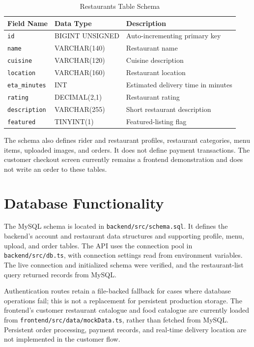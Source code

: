 \begin{table}[H]
\centering
\caption{Restaurants Table Schema}
\label{tab:restaurants}
\begin{tabular}{|l|l|p{7cm}|}
\hline
\textbf{Field Name} & \textbf{Data Type} & \textbf{Description} \\ \hline
\texttt{id} & BIGINT UNSIGNED & Auto-incrementing primary key \\ \hline
\texttt{name} & VARCHAR(140) & Restaurant name \\ \hline
\texttt{cuisine} & VARCHAR(120) & Cuisine description \\ \hline
\texttt{location} & VARCHAR(160) & Restaurant location \\ \hline
\texttt{eta\_minutes} & INT & Estimated delivery time in minutes \\ \hline
\texttt{rating} & DECIMAL(2,1) & Restaurant rating \\ \hline
\texttt{description} & VARCHAR(255) & Short restaurant description \\ \hline
\texttt{featured} & TINYINT(1) & Featured-listing flag \\ \hline
\end{tabular}
\end{table}

The schema also defines rider and restaurant profiles, restaurant categories, menu items, uploaded images, and orders. It does not define payment transactions. The customer checkout screen currently remains a frontend demonstration and does not write an order to these tables.

\section{Database Functionality}

The MySQL schema is located in \texttt{backend/src/schema.sql}. It defines the backend's account and restaurant data structures and supporting profile, menu, upload, and order tables. The API uses the connection pool in \texttt{backend/src/db.ts}, with connection settings read from environment variables. The live connection and initialized schema were verified, and the restaurant-list query returned records from MySQL.

Authentication routes retain a file-backed fallback for cases where database operations fail; this is not a replacement for persistent production storage. The frontend's customer restaurant catalogue and food catalogue are currently loaded from \texttt{frontend/src/data/mockData.ts}, rather than fetched from MySQL. Persistent order processing, payment records, and real-time delivery location are not implemented in the customer flow.
